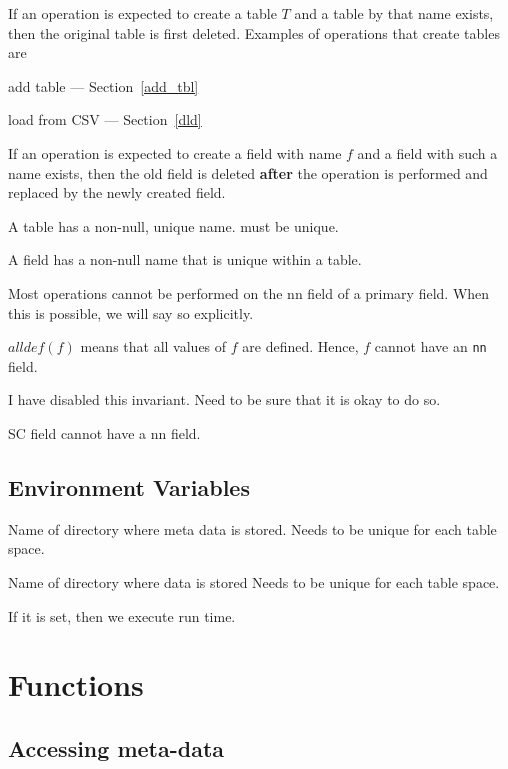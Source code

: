 \be
\item If an operation is expected to create a table \(T\) and a table
by that name exists, then the original table is first deleted. Examples
of operations that create tables are
\be
\item add table --- Section~\ref{add_tbl}
\item load from CSV --- Section~\ref{dld}
\ee
\item 
If an operation is expected to create a field with name \(f\) and a
field with such a name exists, then the old field is deleted {\bf after}
the operation is performed and replaced by the newly created field. 
\item A table has a non-null, unique name.
must be unique. 
\item A field has a non-null name that is unique within a table.
\item Most operations cannot be performed on the nn field of a primary
field. When this is possible, we will say so explicitly. 
\ee

\begin{notation}
\(alldef(f)\) means that all values of \(f\) are defined. Hence, \(f\)
  cannot have an {\tt nn} field.
\end{notation}

I have disabled this invariant. Need to be sure that it is okay to do
so.
\begin{invariant}
SC field cannot have a nn field.
\end{invariant}

\subsection{Environment Variables}

\bd
\item [Q\_DOCROOT] Name of directory where meta data is stored. 
Needs to be unique for each table space. 
\item [Q\_DATA\_DIR] Name of directory where data is stored
Needs to be unique for each table space. 
\item [Q\_RUN\_TIME\_CHECKS] If it is set, then we execute run time.
\ed


\section{Functions}

\subsection{Accessing meta-data}

